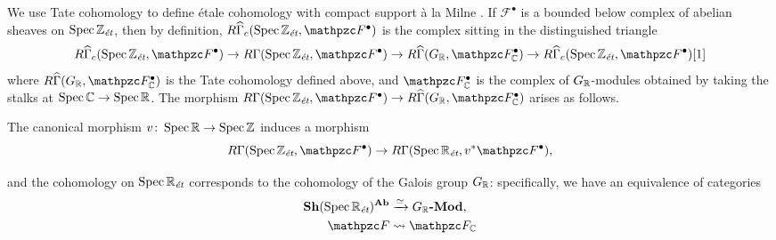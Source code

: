 We use Tate cohomology to define étale cohomology with compact support à la
Milne \cite[\S II.2]{Milne-ADT}. If $\mathcal{F}^\bullet$ is a bounded below
complex of abelian sheaves on $\operatorname{Spec} \mathbb{Z}_\text{\it ét}$, then by definition,
$R\widehat{\Gamma}_c (\Spec \ZZ_\text{\it ét}, \mathcal{F}^\bullet)$ is the
complex sitting in the distinguished triangle
\[ R\widehat{\Gamma}_c (\Spec \ZZ_\text{\it ét}, \mathcal{F}^\bullet) \to
  R\Gamma (\Spec \ZZ_\text{\it ét}, \mathcal{F}^\bullet) \to
  R\widehat{\Gamma} (G_\RR, \mathcal{F}^\bullet_\CC) \to
  R\widehat{\Gamma}_c (\Spec \ZZ_\text{\it ét}, \mathcal{F}^\bullet) [1] \]
where $R\widehat{\Gamma} (G_\RR, \mathcal{F}^\bullet_\CC)$ is the Tate
cohomology defined above, and $\mathcal{F}^\bullet_\CC$ is the complex of
$G_{\mathbb{R}}$-modules obtained by taking the stalks at $\operatorname{Spec} \mathbb{C} \to \operatorname{Spec} \mathbb{R}$.
The morphism
$R\Gamma (\Spec \ZZ_\text{\it ét}, \mathcal{F}^\bullet) \to R\widehat{\Gamma} (G_\RR, \mathcal{F}^\bullet_\CC)$
arises as follows.

The canonical morphism $v\colon \operatorname{Spec} \mathbb{R} \to \operatorname{Spec} \mathbb{Z}$ induces a morphism
\begin{equation}
  \label{eqn:cohomology-on-SpecZ-and-SpecR}
  R\Gamma (\Spec \ZZ_\text{\it ét}, \mathcal{F}^\bullet) \to
  R\Gamma (\Spec \RR_\text{\it ét}, v^* \mathcal{F}^\bullet),
\end{equation}

\noindent and the cohomology on $\operatorname{Spec} \mathbb{R}_\text{\it ét}$ corresponds to the
cohomology of the Galois group $G_{\mathbb{R}}$: specifically, we have an equivalence of
categories
\begin{align*}
  \categ{Sh} (\Spec \RR_\text{\it ét})^\categ{Ab} & \xrightarrow{\cequiv} G_\RR\categ{-Mod},\\
  \mathcal{F} & \rightsquigarrow \mathcal{F}_\CC
\end{align*}

